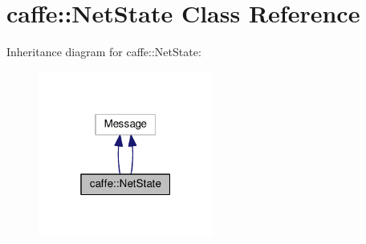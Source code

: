 \hypertarget{classcaffe_1_1_net_state}{}\section{caffe\+:\+:Net\+State Class Reference}
\label{classcaffe_1_1_net_state}


Inheritance diagram for caffe\+:\+:Net\+State\+:
\nopagebreak
\begin{figure}[H]
\begin{center}
\leavevmode
\includegraphics[width=163pt]{classcaffe_1_1_net_state__inherit__graph}
\end{center}
\end{figure}
